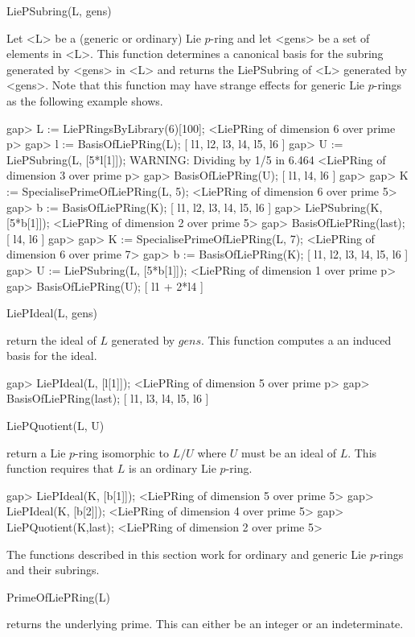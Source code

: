 \> LiePSubring(L, gens)

Let <L> be a (generic or ordinary) Lie $p$-ring and let <gens> be a set of 
elements in <L>. This function determines a canonical basis for the subring
generated by <gens> in <L> and returns the LiePSubring of <L> generated by
<gens>. Note that this function may have strange effects for generic Lie
$p$-rings as the following example shows.

\beginexample
gap> L := LiePRingsByLibrary(6)[100];
<LiePRing of dimension 6 over prime p>
gap> l := BasisOfLiePRing(L);
[ l1, l2, l3, l4, l5, l6 ]
gap> U := LiePSubring(L, [5*l[1]]);
WARNING: Dividing by 1/5 in 6.464
<LiePRing of dimension 3 over prime p>
gap> BasisOfLiePRing(U);
[ l1, l4, l6 ]
gap>
gap>  K := SpecialisePrimeOfLiePRing(L, 5);
<LiePRing of dimension 6 over prime 5>
gap>  b := BasisOfLiePRing(K);
[ l1, l2, l3, l4, l5, l6 ]
gap> LiePSubring(K, [5*b[1]]);
<LiePRing of dimension 2 over prime 5>
gap>  BasisOfLiePRing(last);
[ l4, l6 ]
gap>
gap> K := SpecialisePrimeOfLiePRing(L, 7);
<LiePRing of dimension 6 over prime 7>
gap> b := BasisOfLiePRing(K);
[ l1, l2, l3, l4, l5, l6 ]
gap> U := LiePSubring(L, [5*b[1]]);
<LiePRing of dimension 1 over prime p>
gap> BasisOfLiePRing(U);
[ l1 + 2*l4 ]
\endexample

\> LiePIdeal(L, gens)

return the ideal of $L$ generated by $gens$. This function computes a
an induced basis for the ideal.

\beginexample
gap> LiePIdeal(L, [l[1]]);
<LiePRing of dimension 5 over prime p>
gap> BasisOfLiePRing(last);
[ l1, l3, l4, l5, l6 ]
\endexample

\> LiePQuotient(L, U)

return a Lie $p$-ring isomorphic to $L/U$ where $U$ must be an ideal of
$L$. This function requires that $L$ is an ordinary Lie $p$-ring.

\beginexample
gap> LiePIdeal(K, [b[1]]);
<LiePRing of dimension 5 over prime 5>
gap> LiePIdeal(K, [b[2]]);
<LiePRing of dimension 4 over prime 5>
gap> LiePQuotient(K,last);
<LiePRing of dimension 2 over prime 5>
\endexample


The functions described in this section work for ordinary and generic
Lie $p$-rings and their subrings.

\> PrimeOfLiePRing(L)

returns the underlying prime. This can either be an integer or an
indeterminate.

